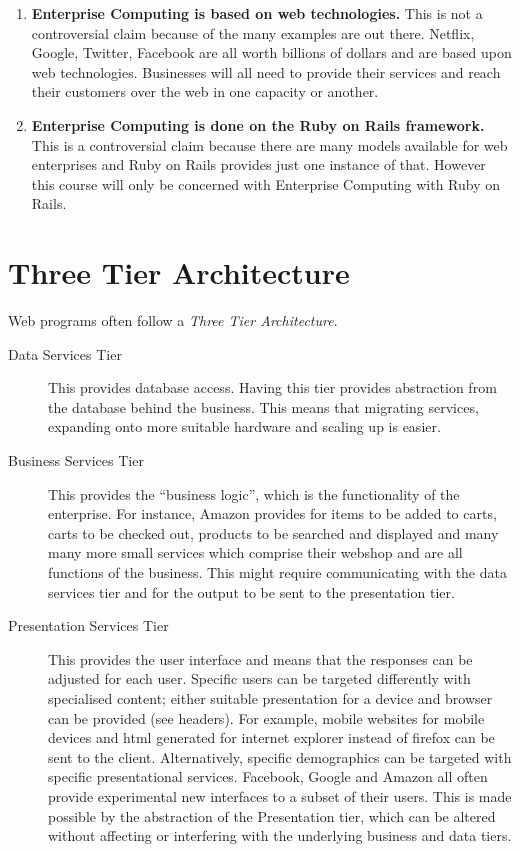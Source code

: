 \documentclass[11pt]{article}
\begin{document}
\begin{enumerate}
\item \textbf{Enterprise Computing is based on web technologies.} This is not a controversial claim because of the many examples are out there. Netflix, Google, Twitter, Facebook are all worth billions of dollars and are based upon web technologies. Businesses will all need to provide their services and reach their customers over the web in one capacity or another.
\item \textbf{Enterprise Computing is done on the Ruby on Rails framework.} This is a controversial claim because there are many models available for web enterprises and Ruby on Rails provides just one instance of that. However this course will only be concerned with Enterprise Computing with Ruby on Rails.
\end{enumerate}

\section{Three Tier Architecture}
\label{sec:tier}

Web programs often follow a \textit{Three Tier Architecture}.
\begin{description}
\item[Data Services Tier]
This provides database access. Having this tier provides abstraction from the database behind the business. This means that migrating services, expanding onto more suitable hardware and scaling up is easier.
\item[Business Services Tier]
This provides the ``business logic'', which is the functionality of the enterprise. For instance, Amazon provides for items to be added to carts, carts to be checked out, products to be searched and displayed and many many more small services which comprise their webshop and are all functions of the business. This might require communicating with the data services tier and for the output to be sent to the presentation tier.
\item[Presentation Services Tier]
This provides the user interface and means that the responses can be adjusted for each user. Specific users can be targeted differently with specialised content; either suitable presentation for a device and browser can be provided (see headers). For example, mobile websites for mobile devices and html generated for internet explorer instead of firefox can be sent to the client. Alternatively, specific demographics can be targeted with specific presentational services. Facebook, Google and Amazon all often provide experimental new interfaces to a subset of their users. This is made possible by the abstraction of the Presentation tier, which can be altered without affecting or interfering with the underlying business and data tiers.    %
\end{description}
\end{document}
